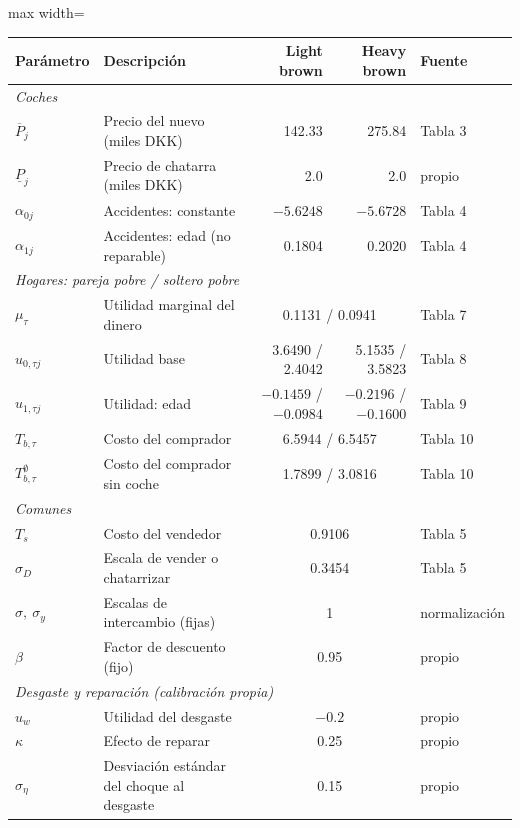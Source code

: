 \documentclass{article}
\begin{document}
\begin{table}[htbp]
\centering
\small
\begin{adjustbox}{max width=\textwidth}
\begin{tabular}{llrrl}
\toprule
Parámetro & Descripción & Light brown & Heavy brown & Fuente \\
\midrule
\multicolumn{5}{l}{\textit{Coches}}\\
$\overline{P}_j$ & Precio del nuevo (miles DKK) & 142.33 & 275.84 & Tabla 3 \\
$\underline{P}_j$ & Precio de chatarra (miles DKK) & 2.0 & 2.0 & propio \\
$\alpha_{0j}$ & Accidentes: constante & $-5.6248$ & $-5.6728$ & Tabla 4 \\
$\alpha_{1j}$ & Accidentes: edad (no reparable) & 0.1804 & 0.2020 & Tabla 4 \\
\midrule
\multicolumn{5}{l}{\textit{Hogares: pareja pobre / soltero pobre}}\\
$\mu_\tau$ & Utilidad marginal del dinero & \multicolumn{2}{c}{0.1131 / 0.0941} & Tabla 7 \\
$u_{0,\tau j}$ & Utilidad base & 3.6490 / 2.4042 & 5.1535 / 3.5823 & Tabla 8 \\
$u_{1,\tau j}$ & Utilidad: edad & $-0.1459$ / $-0.0984$ & $-0.2196$ / $-0.1600$ & Tabla 9 \\
$T_{b,\tau}$ & Costo del comprador & \multicolumn{2}{c}{6.5944 / 6.5457} & Tabla 10 \\
$T^{\emptyset}_{b,\tau}$ & Costo del comprador sin coche & \multicolumn{2}{c}{1.7899 / 3.0816} & Tabla 10 \\
\midrule
\multicolumn{5}{l}{\textit{Comunes}}\\
$T_s$ & Costo del vendedor & \multicolumn{2}{c}{0.9106} & Tabla 5 \\
$\sigma_D$ & Escala de vender o chatarrizar & \multicolumn{2}{c}{0.3454} & Tabla 5 \\
$\sigma,\ \sigma_y$ & Escalas de intercambio (fijas) & \multicolumn{2}{c}{1} & normalización \\
$\beta$ & Factor de descuento (fijo) & \multicolumn{2}{c}{0.95} & propio \\
\midrule
\multicolumn{5}{l}{\textit{Desgaste y reparación (calibración propia)}}\\
$u_w$ & Utilidad del desgaste & \multicolumn{2}{c}{$-0.2$} & propio \\
$\kappa$ & Efecto de reparar & \multicolumn{2}{c}{0.25} & propio \\
$\sigma_\eta$ & Desviación estándar del choque al desgaste & \multicolumn{2}{c}{0.15} & propio \\

\end{tabular}
\end{adjustbox}
\end{table}
\end{document}
